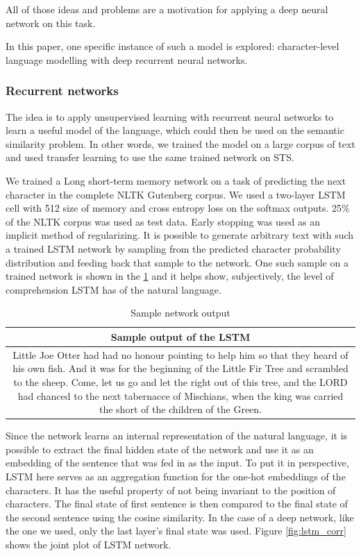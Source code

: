 \documentclass[10pt, a4paper]{article}
\begin{document}
All of those ideas and problems are a motivation for applying a deep neural network on this task.

In this paper, one specific instance of such a model is explored: character-level language modelling with deep recurrent neural networks.

\subsubsection{Recurrent networks}

The idea is to apply unsupervised learning with recurrent neural networks to learn a useful model of the language, which could then be used on the semantic similarity problem.
In other words, we trained the model on a large corpus of text and used transfer learning to use the same trained network on STS.

We trained a Long short-term memory network \citep{LSTM} on a task of predicting the next character in the complete NLTK Gutenberg corpus. 
We used a two-layer LSTM cell with 512 size of memory and cross entropy loss on the softmax outputs.
25\% of the NLTK corpus was used as test data. Early stopping was used as an implicit method of regularizing.
It is possible to generate arbitrary text with such a trained LSTM network by sampling from the predicted character probability distribution and feeding back that sample to the network. 
One such sample on a trained network is shown in the \ref{tab:sample_output} and it helps show, subjectively, the level of comprehension LSTM has of the natural language.

\begin{table}
\caption{Sample network output}
\label{tab:sample_output}
\begin{center}
\begin{tabular}{c}
\toprule
Sample output of the LSTM \\
\midrule
\multicolumn{1}{m{6.5cm}}{Little Joe Otter had had no honour pointing to help him so that they
heard of his own fish.  And it was for the beginning of the Little Fir Tree and
scrambled to the sheep. 
Come, let us go and let the right out of this tree, and the LORD had chanced
to the next tabernacce of Mischians, when the king was carried the short of the children of the Green.}
\bottomrule
\end{tabular}
\end{center}
\end{table}

Since the network learns an internal representation of the natural language, it is possible to extract the final hidden state of the network and use it as an embedding of the sentence that was fed in as the input.
To put it in perspective, LSTM here serves as an aggregation function for the one-hot embeddings of the characters. 
It has the useful property of not being invariant to the position of characters.
The final state of first sentence is then compared to the final state of the second sentence using the cosine similarity. 
In the case of a deep network, like the one we used, only the last layer's final state was used.
Figure \ref{fig:lstm_corr} shows the joint plot of LSTM network.
\end{document}
